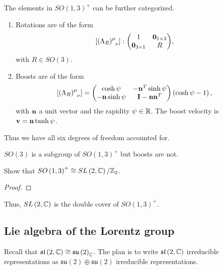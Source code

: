 The elements in $SO \left( 1,3 \right)^{+}$ can be further categorized.
\begin{enumerate}
    \item Rotations are of the form
        \begin{align}
            \left[ \tensor{\left( \Lambda_R \right)}{^{\mu}_{\nu}}  \right]  : \mqty( 1 & \vb{0}_{1\times 3} \\ \vb{0}_{3\times 1} & R )
        ,\end{align}
        with $R \in SO \left( 3 \right) $.
    \item Boosts are of the form
        \begin{align}
            \left[ \tensor{\left( \Lambda_B \right) }{^{\mu}_\nu} \right] = \mqty( \cosh \psi & -\vb{n}^{T} \sinh \psi \\ - \vb{n} \sinh \psi & \vb{I} - \vb{n} \vb{n}^{T}) \left( \cosh \psi -1 \right) 
        ,\end{align}
        with $\vb{n}$ a unit vector and the rapidity $\psi \in \mathbb{R}$. The boost velocity is $\vb{v} = \vb{n} \tanh \psi$.
\end{enumerate}

Thus we have all six degrees of freedom accounted for.

\begin{note}
    $SO \left( 3 \right) $ is a subgroup of $SO \left( 1,3 \right)^{+}$ but boosts are not.
\end{note}

\begin{exercise}
    Show that $SO\left( 1,3 \right)^{+} \cong SL\left( 2, \mathbb{C} \right) / \mathbb{Z}_2$.
\end{exercise}

\begin{proof}
    
\end{proof}

Thus, $SL \left( 2, \mathbb{C} \right)$ is the double cover of $SO \left( 1,3 \right)^{+}$.

\subsection{Lie algebra of the Lorentz group}

Recall that $\mathfrak{sl}\left( 2,\mathbb{C} \right) \cong \mathfrak{su}\left( 2\right)_{\mathbb{C}}$. The plan is to write $\mathfrak{sl}\left( 2,\mathbb{C} \right) $ irreducible representations as $\mathfrak{su}\left( 2 \right) \oplus \mathfrak{su}\left( 2 \right) $ irreducible representations.

